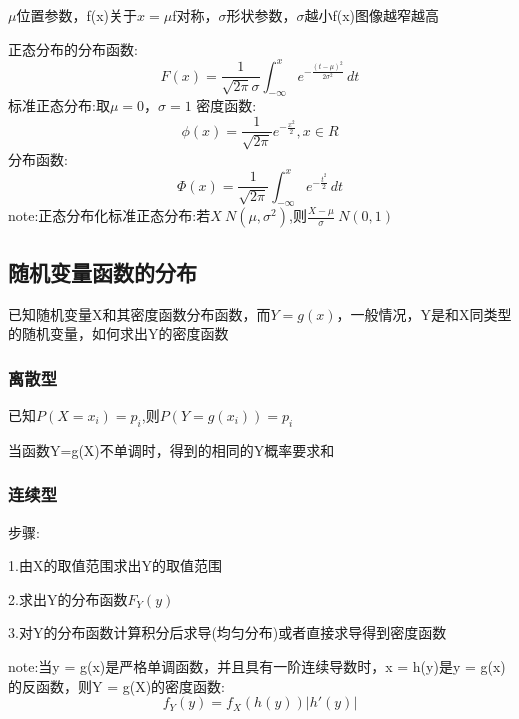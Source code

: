 \documentclass[11pt,twoside,a4paper]{ctexart}
\begin{document}
    $\mu $位置参数，f(x)关于$x=\mu $f对称，$\sigma $形状参数，$\sigma $越小f(x)图像越窄越高

    正态分布的分布函数:
    \[F(x) = \frac{1}{\sqrt{2\pi }\sigma}\int_{-\infty}^{x}e^{-\frac{(t-\mu)^2}{2\sigma^2}}  \,dt \]
    标准正态分布:取$\mu = 0 ，\sigma  = 1$ 密度函数:
    \[\phi (x) = \frac{1}{\sqrt{2\pi}}e^{-\frac{x^2}{2}},x\in R\]
    分布函数:
    \[\Phi (x) = \frac{1}{\sqrt{2\pi}}\int_{-\infty}^{x}e^{-\frac{t^2}{2}}\,dt \]
    note:正态分布化标准正态分布:若$X~N(\mu ,\sigma ^2)$,则$\frac{X-\mu}{\sigma} ~N(0,1)$
    \subsection{随机变量函数的分布}
    已知随机变量X和其密度函数分布函数，而$Y = g(x)$，一般情况，Y是和X同类型的随机变量，如何求出Y的密度函数
    \subsubsection{离散型}
    已知$P(X = x_i) = p_i$,则$P(Y = g(x_i)) = p_i$

    当函数Y=g(X)不单调时，得到的相同的Y概率要求和
    \subsubsection{连续型}
    步骤:
    \begin{minipage}[t]{0.9\linewidth}
        1.由X的取值范围求出Y的取值范围

        2.求出Y的分布函数$F_Y(y)$

        3.对Y的分布函数计算积分后求导(均匀分布)或者直接求导得到密度函数
        
    \end{minipage}
    note:当y = g(x)是严格单调函数，并且具有一阶连续导数时，x = h(y)是y = g(x)的反函数，则Y = g(X)的密度函数:
    \[f_Y(y) = f_X(h(y))|h'(y)|\]


    
\end{document}
